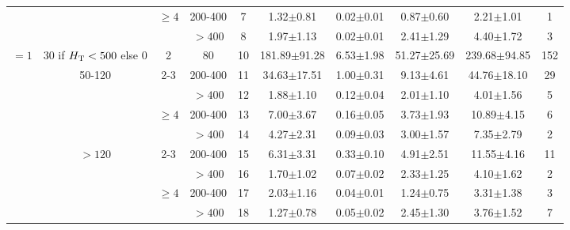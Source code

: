 \begin{table}
{\begin{minipage}{\textwidth}
\begin{tabular}{|c|c|c|c|c|c|c|c|c|c|}
                          &                         & \multirow{2}{*}{$\geq 4$} & 200-400 & 7  & 1.32$\pm$0.81     & 0.02$\pm$0.01  & 0.87$\pm$0.60     & 2.21$\pm$1.01     & 1        \\ \cline{4-5}
                          &                         &                           & $>400$  & 8  & 1.97$\pm$1.13     & 0.02$\pm$0.01  & 2.41$\pm$1.29     & 4.40$\pm$1.72     & 3        \\ \hline
\multirow{9}{*}{$=1$}     & 30 if $H_{\mathrm{T}}<500$ else 0  & 2                         & 80      & 10 & 181.89$\pm$91.28  & 6.53$\pm$1.98  & 51.27$\pm$25.69   & 239.68$\pm$94.85  & 152      \\ \cline{2-5}
                          & \multirow{4}{*}{50-120} & \multirow{2}{*}{2-3}      & 200-400 & 11 & 34.63$\pm$17.51   & 1.00$\pm$0.31  & 9.13$\pm$4.61     & 44.76$\pm$18.10   & 29       \\ \cline{4-5}
                          &                         &                           & $>400$  & 12 & 1.88$\pm$1.10     & 0.12$\pm$0.04  & 2.01$\pm$1.10     & 4.01$\pm$1.56     & 5        \\ \cline{3-5}
                          &                         & \multirow{2}{*}{$\geq 4$} & 200-400 & 13 & 7.00$\pm$3.67     & 0.16$\pm$0.05  & 3.73$\pm$1.93     & 10.89$\pm$4.15    & 6        \\ \cline{4-5}
                          &                         &                           & $>400$  & 14 & 4.27$\pm$2.31     & 0.09$\pm$0.03  & 3.00$\pm$1.57     & 7.35$\pm$2.79     & 2        \\ \cline{2-5}
                          & \multirow{4}{*}{$>120$} & \multirow{2}{*}{2-3}      & 200-400 & 15 & 6.31$\pm$3.31     & 0.33$\pm$0.10  & 4.91$\pm$2.51     & 11.55$\pm$4.16    & 11       \\ \cline{4-5}
                          &                         &                           & $>400$  & 16 & 1.70$\pm$1.02     & 0.07$\pm$0.02  & 2.33$\pm$1.25     & 4.10$\pm$1.62     & 2        \\ \cline{3-5}
                          &                         & \multirow{2}{*}{$\geq 4$} & 200-400 & 17 & 2.03$\pm$1.16     & 0.04$\pm$0.01  & 1.24$\pm$0.75     & 3.31$\pm$1.38     & 3        \\ \cline{4-5}
                          &                         &                           & $>400$  & 18 & 1.27$\pm$0.78     & 0.05$\pm$0.02  & 2.45$\pm$1.30     & 3.76$\pm$1.52     & 7        \\ \hline

\end{tabular}
\end{minipage}}
\end{table}
